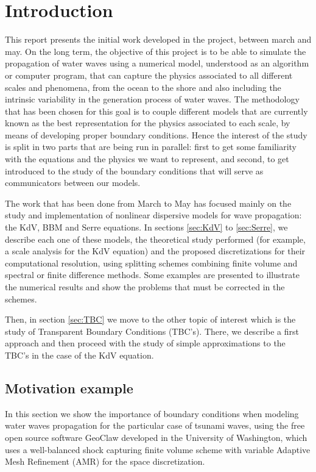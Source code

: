 \section{Introduction}

\indent This report presents the initial work developed in the project, between march and may. On the long term, the objective of this project is to be able to simulate the propagation of water waves using a numerical model, understood as an algorithm or computer program, that can capture the physics associated to all different scales and phenomena, from the ocean to the shore and also including the intrinsic variability in the generation process of water waves. The methodology that has been chosen for this goal is to couple different models that are currently known as the best representation for the physics associated to each scale, by means of developing proper boundary conditions. Hence the interest of the study is split in two parts that are being run in parallel: first to get some familiarity with the equations and the physics we want to represent, and second, to get introduced to the study of the boundary conditions that will serve as communicators between our models.

The work that has been done from March to May has focused mainly on the study and implementation of nonlinear dispersive models for wave propagation: the KdV, BBM and Serre equations. In sections \ref{sec:KdV} to \ref{sec:Serre}, we describe each one of these models, the theoretical study performed (for example, a scale analysis for the KdV equation) and the proposed discretizations for their computational resolution, using splitting schemes combining finite volume and spectral or finite difference methods. Some examples are presented to illustrate the numerical results and show the problems that must be corrected in the schemes.

\indent Then, in section \ref{sec:TBC} we move to the other topic of interest which is the study of Transparent Boundary Conditions (TBC's). There, we describe a first approach and then proceed with the study of simple approximations to the TBC's in the case of the KdV equation.

\subsection{Motivation example}

In this section we show the importance of boundary conditions when modeling water waves propagation for the particular case of tsunami waves, using the free open source software GeoClaw \cite{geoclaw} developed in the University of Washington, which uses a well-balanced shock capturing finite volume scheme with variable Adaptive Mesh Refinement (AMR) for the space discretization.


